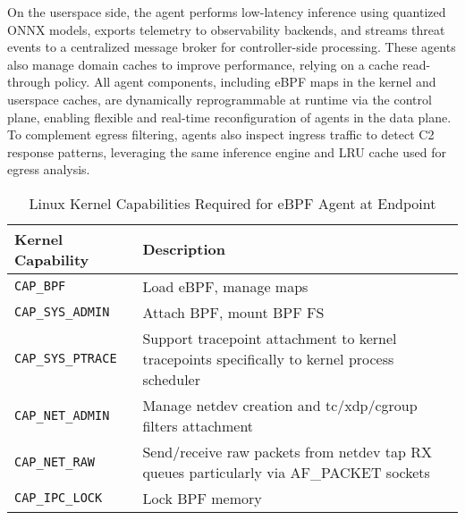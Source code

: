 \documentclass [11pt, proquest] {uwthesis}[2020/02/24]
\begin{document}
On the userspace side, the agent performs low-latency inference using quantized ONNX models, exports telemetry to observability backends, and streams threat events to a centralized message broker for controller-side processing. These agents also manage domain caches to improve performance, relying on a cache read-through policy. All agent components, including eBPF maps in the kernel and userspace caches, are dynamically reprogrammable at runtime via the control plane, enabling flexible and real-time reconfiguration of agents in the data plane. To complement egress filtering, agents also inspect ingress traffic to detect C2 response patterns, leveraging the same inference engine and LRU cache used for egress analysis.
\begin{table}[htbp]
\centering
\caption{Linux Kernel Capabilities Required for eBPF Agent at Endpoint}
\begin{tabular}{|l|p{10cm}|}
\hline
\textbf{Kernel Capability} & \textbf{Description} \\
\hline
\texttt{CAP\_BPF} & Load eBPF, manage maps \\
\hline
\texttt{CAP\_SYS\_ADMIN} & Attach BPF, mount BPF FS \\
\hline
\texttt{CAP\_SYS\_PTRACE} & Support tracepoint attachment to kernel tracepoints  specifically to kernel process scheduler \\ 
\hline
\texttt{CAP\_NET\_ADMIN} & Manage netdev creation and tc/xdp/cgroup filters attachment \\
\hline
\texttt{CAP\_NET\_RAW} & Send/receive raw packets from netdev tap RX queues particularly via AF\_PACKET sockets  \\
\hline
\texttt{CAP\_IPC\_LOCK} & Lock BPF memory \\
\hline
\end{tabular}
\label{sec:dp_kernel_cap}
\end{table}
\end{document}
